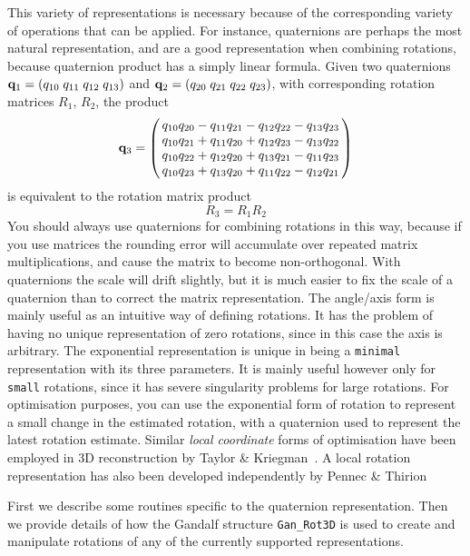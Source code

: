 This variety of representations is necessary because of the corresponding
variety of operations that can be applied. For instance, quaternions are
perhaps the most natural representation, and are a good representation
when combining rotations, because quaternion product has a simply linear
formula. Given two quaternions $\qvec_1=(q_{10}\;q_{11}\;q_{12}\;q_{13})$
and $\qvec_2=(q_{20}\;q_{21}\;q_{22}\;q_{23})$, with corresponding rotation
matrices $R_1$, $R_2$, the product
\[ \qvec_3 = \beginm{c}
               q_{10} q_{20} - q_{11} q_{21} - q_{12} q_{22} - q_{13} q_{23}\\
               q_{10} q_{21} + q_{11} q_{20} + q_{12} q_{23} - q_{13} q_{22}\\
               q_{10} q_{22} + q_{12} q_{20} + q_{13} q_{21} - q_{11} q_{23}\\
               q_{10} q_{23} + q_{13} q_{20} + q_{11} q_{22} - q_{12} q_{21}
   \endm
\]
is equivalent to the rotation matrix product
\[ R_3 = R_1 R_2
\]
You should always use quaternions for combining rotations in this way, because
if you use matrices the rounding error will accumulate over repeated
matrix multiplications, and cause the matrix to become non-orthogonal.
With quaternions the scale will drift slightly, but it is much easier to fix
the scale of a quaternion than to correct the matrix representation.
The angle/axis form is mainly useful as an intuitive way of defining
rotations. It has the problem of having no unique representation of
zero rotations, since in this case the axis is arbitrary.
The exponential representation is unique in being a {\tt minimal}
representation with its three parameters. It is mainly useful however only
for {\tt small} rotations, since it has severe singularity problems for
large rotations. For optimisation purposes, you can use the exponential
form of rotation to represent a small change in the estimated rotation,
with a quaternion used to represent the latest rotation estimate.
Similar {\em local coordinate} forms of optimisation have been
employed in 3D reconstruction by Taylor \&
Kriegman~\cite{Taylor:Kriegman:PAMI95}. A local rotation
representation has also been developed independently by Pennec \&
Thirion~\cite{Pennec:Thirion:IJCV97}

First we describe some routines specific to the quaternion representation.
Then we provide details of how the Gandalf structure {\tt Gan\_Rot3D}
is used to create and manipulate rotations of any of the currently
supported representations.

